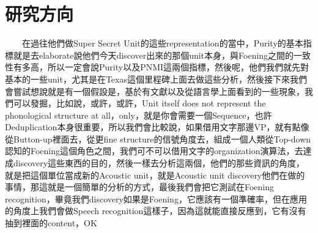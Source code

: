 \section{研究方向}

　　在過往他們做Super Secret Unit的這些representation的當中，Purity的基本指標就是去elaborate說他們今天discover出來的那個unit本身，與Foening之間的一致性有多高，所以一定會說Purity以及PNMI這兩個指標，然後呢，他們我們就先對基本的一些unit，尤其是在Texas這個里程碑上面去做這些分析，然後接下來我們會嘗試想說就是有一個假設是，基於有文獻以及從語言學上面看到的一些現象，我們可以發掘，比如說，或許，或許，Unit itself does not represent the phonological structure at all，only，就是你會需要一個Sequence，也許Deduplication本身很重要，所以我們會比較說，如果借用文字那邊VP，就有點像從Button-up裡面去，從更fine structure的信號角度去，組成一個人類從Top-down認知的Foening這個角色之間，我們可不可以借用文字的organization演算法，去達成discovery這些東西的目的，然後一樣去分析這兩個，他們的那些資訊的角度，就是把這個單位當成新的Acoustic unit，就是Acoustic unit discovery他們在做的事情，那這就是一個簡單的分析的方式，最後我們會把它測試在Foening recognition，畢竟我們discovery如果是Foening，它應該有一個準確率，但在應用的角度上我們會做Speech recognition這樣子，因為這就能直接反應到，它有沒有抽到裡面的content，OK

